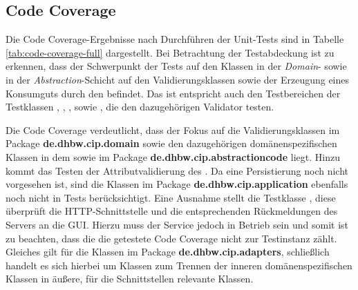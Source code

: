 \subsection*{Code Coverage}
Die Code Coverage-Ergebnisse nach Durchführen der Unit-Tests sind in Tabelle \ref{tab:code-coverage-full} dargestellt.
Bei Betrachtung der Testabdeckung ist zu erkennen, dass der Schwerpunkt der Tests auf den Klassen in der \textit{Domain}- sowie in der \textit{Abstraction}-Schicht auf den Validierungsklassen sowie der Erzeugung eines Konsumguts durch den \href{}{\code{}} befindet.
Das ist entspricht auch den Testbereichen der Testklassen \href{}{\code{}}, \href{}{\code{}}, \href{}{\code{}}, \href{}{\code{}} sowie \href{}{\code{}}, die den dazugehörigen Validator testen.

Die Code Coverage verdeutlicht, dass der Fokus auf die Validierungsklassen im Package \textbf{de.dhbw.cip.domain} sowie den dazugehörigen domänenspezifischen Klassen in dem sowie im Package \textbf{de.dhbw.cip.abstractioncode} liegt. 
Hinzu kommt das Testen der Attributvalidierung des \href{}{\code{}}.
Da eine Persistierung noch nicht vorgesehen ist, sind die Klassen im Package \textbf{de.dhbw.cip.application} ebenfalls noch nicht in Tests berücksichtigt.
Eine Ausnahme stellt die Testklasse \href{}{\code{}}, diese überprüft die \ac{HTTP}-Schnittstelle und die entsprechenden Rückmeldungen des Servers an die GUI. 
Hierzu muss der Service jedoch in Betrieb sein und somit ist zu beachten, dass die die getestete Code Coverage nicht zur Testinstanz zählt.
Gleiches gilt für die Klassen im Package \textbf{de.dhbw.cip.adapters}, schließlich handelt es sich hierbei um Klassen zum Trennen der inneren domänenspezifischen Klassen in äußere, für die Schnittstellen relevante Klassen.

